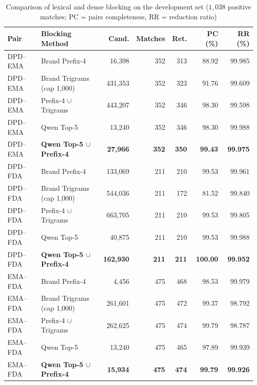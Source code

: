 \documentclass{llncs}
\begin{document}
\begin{table}[htbp]
\centering
\caption{Comparison of lexical and dense blocking on the development set ($1{,}038$ positive matches; PC = pairs completeness, RR = reduction ratio)}
\label{tab:blocking_development}
\scriptsize
\setlength{\tabcolsep}{2.5pt}
\begin{tabularx}{\textwidth}{|l|>{\raggedright\arraybackslash}X|r|r|r|r|r|}
\hline
\textbf{Pair} & \textbf{Blocking Method} & \textbf{Cand.} & \textbf{Matches} & \textbf{Ret.} & \textbf{PC (\%)} & \textbf{RR (\%)} \\
\hline
DPD--EMA & Brand Prefix-4                     &  16,398 & 352 & 313 &  88.92 & 99.985 \\
DPD--EMA & Brand Trigrams (cap 1,000)         & 431,353 & 352 & 323 &  91.76 & 99.609 \\
DPD--EMA & Prefix-4 $\cup$ Trigrams           & 443,207 & 352 & 346 &  98.30 & 99.598 \\
DPD--EMA & Qwen Top-5                         &  13,240 & 352 & 346 &  98.30 & 99.988 \\
DPD--EMA & \textbf{Qwen Top-5 $\cup$ Prefix-4}& \textbf{27,966} & \textbf{352} & \textbf{350} & \textbf{99.43} & \textbf{99.975} \\
\hline
DPD--FDA & Brand Prefix-4                     & 133,069 & 211 & 210 &  99.53 & 99.961 \\
DPD--FDA & Brand Trigrams (cap 1,000)         & 544,036 & 211 & 172 &  81.52 & 99.840 \\
DPD--FDA & Prefix-4 $\cup$ Trigrams           & 663,705 & 211 & 210 &  99.53 & 99.805 \\
DPD--FDA & Qwen Top-5                         &  40,875 & 211 & 210 &  99.53 & 99.988 \\
DPD--FDA & \textbf{Qwen Top-5 $\cup$ Prefix-4}& \textbf{162,930} & \textbf{211} & \textbf{211} & \textbf{100.00} & \textbf{99.952} \\
\hline
EMA--FDA & Brand Prefix-4                     &   4,456 & 475 & 468 &  98.53 & 99.979 \\
EMA--FDA & Brand Trigrams (cap 1,000)         & 261,601 & 475 & 472 &  99.37 & 98.792 \\
EMA--FDA & Prefix-4 $\cup$ Trigrams           & 262,625 & 475 & 474 &  99.79 & 98.787 \\
EMA--FDA & Qwen Top-5                         &  13,240 & 475 & 465 &  97.89 & 99.939 \\
EMA--FDA & \textbf{Qwen Top-5 $\cup$ Prefix-4}& \textbf{15,934} & \textbf{475} & \textbf{474} & \textbf{99.79} & \textbf{99.926} \\
\hline
\end{tabularx}
\end{table}
\end{document}
